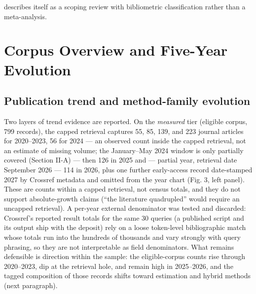 \documentclass[journal]{IEEEtran}
\begin{document}
describes itself as a scoping review with bibliometric classification rather than a meta-analysis.

\section{Corpus Overview and Five-Year Evolution}

\subsection{Publication trend and method-family evolution}

Two layers of trend evidence are reported. On the \textit{measured} tier (eligible corpus, 799 records), the capped retrieval captures 55, 85, 139, and 223 journal articles for 2020--2023, 56 for 2024 --- an observed count inside the capped retrieval, not an estimate of missing volume; the January--May 2024 window is only partially covered (Section II-A) --- then 126 in 2025 and --- partial year, retrieval date September 2026 --- 114 in 2026, plus one further early-access record date-stamped 2027 by Crossref metadata and omitted from the year chart (Fig. 3, left panel). These are counts within a capped retrieval, not census totals, and they do not support absolute-growth claims (``the literature quadrupled'' would require an uncapped retrieval). A per-year external denominator was tested and discarded: Crossref's reported result totals for the same 30 queries (a published script and its output ship with the deposit) rely on a loose token-level bibliographic match whose totals run into the hundreds of thousands and vary strongly with query phrasing, so they are not interpretable as field denominators. What remains defensible is direction within the sample: the eligible-corpus counts rise through 2020--2023, dip at the retrieval hole, and remain high in 2025--2026, and the tagged composition of those records shifts toward estimation and hybrid methods (next paragraph).
\end{document}
